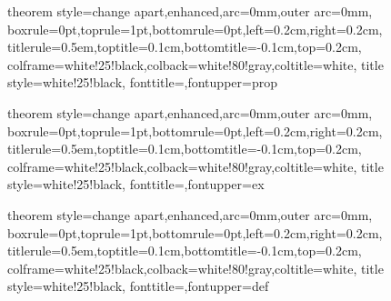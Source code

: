 {theorem style=change apart,enhanced,arc=0mm,outer arc=0mm,
    boxrule=0pt,toprule=1pt,bottomrule=0pt,left=0.2cm,right=0.2cm,
    titlerule=0.5em,toptitle=0.1cm,bottomtitle=-0.1cm,top=0.2cm,
    colframe=white!25!black,colback=white!80!gray,coltitle=white,
    title style={white!25!black},
fonttitle=\sffamily,fontupper=\normalsize}{prop}

{theorem style=change apart,enhanced,arc=0mm,outer arc=0mm,
    boxrule=0pt,toprule=1pt,bottomrule=0pt,left=0.2cm,right=0.2cm,
    titlerule=0.5em,toptitle=0.1cm,bottomtitle=-0.1cm,top=0.2cm,
    colframe=white!25!black,colback=white!80!gray,coltitle=white,
    title style={white!25!black},
fonttitle=\sffamily,fontupper=\normalsize}{ex}

{theorem style=change apart,enhanced,arc=0mm,outer arc=0mm,
    boxrule=0pt,toprule=1pt,bottomrule=0pt,left=0.2cm,right=0.2cm,
    titlerule=0.5em,toptitle=0.1cm,bottomtitle=-0.1cm,top=0.2cm,
    colframe=white!25!black,colback=white!80!gray,coltitle=white,
    title style={white!25!black},
fonttitle=\sffamily,fontupper=\normalsize}{def}

\usepackage{import}
\usepackage{xifthen}
\usepackage{pdfpages}
\usepackage{transparent}

\newcommand{\incfig}[2][1]{%
    \def\svgwidth{#1\columnwidth}
    {#2.pdf_tex}
}

\renewcommand{\implies}{\;\Longrightarrow\;}
\renewcommand{\iff}{\;\Longleftrightarrow\;}

\author{Raúl Estévez Gómez}


